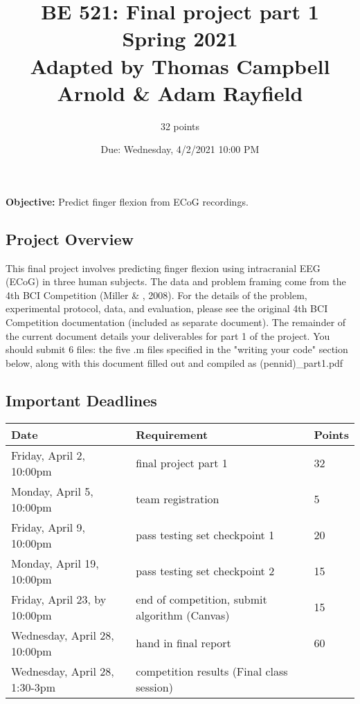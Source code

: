 \documentclass{article}
\begin{document}
    
    


\title{BE 521: Final project part 1 \\{\normalsize Spring 2021}
\\{\normalsize Adapted by Thomas Campbell Arnold \& Adam Rayfield}}
\author{32 points}
\date{Due: Wednesday, 4/2/2021 10:00 PM}
\maketitle \textbf{Objective:} Predict finger flexion from ECoG recordings.

\subsection*{Project Overview}
This final project involves predicting finger flexion using intracranial EEG (ECoG) in three human subjects. The data and problem framing come from the 4th BCI Competition (Miller \& , 2008). For the details of the problem, experimental protocol, data, and evaluation, please see the original 4th BCI Competition documentation (included as separate document). The remainder of the current document details your deliverables for part 1 of the project.  You should submit 6 files: the five .m files specified in the "writing your code" section below, along with this document filled out and compiled as (pennid)\_part1.pdf 

\subsection*{Important Deadlines}
\begin{tabular}{ l|l|l } 
Date & Requirement & Points \\
\hline
Friday, April 2, 10:00pm & final project part 1 & 32 \\
Monday, April 5, 10:00pm & team registration & 5 \\
Friday, April 9, 10:00pm & pass testing set checkpoint 1 & 20 \\
Monday, April 19, 10:00pm & pass testing set checkpoint 2 & 15 \\
Friday,    April 23, by 10:00pm & end of competition, submit algorithm (Canvas) & 15 \\
Wednesday, April 28, 10:00pm & hand in final report & 60 \\
Wednesday, April 28, 1:30-3pm & competition results (Final class session) \\
\end{tabular}
\end{document}
